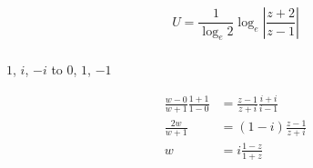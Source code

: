 \documentclass{article}
\begin{document}
\setcounter{subsubsection}{16}
\subsubsection{}

\[U = \frac{1}{\log_e 2} \log_e \left| \frac{z + 2}{z - 1} \right|\]

\setcounter{subsubsection}{18}
\subsubsection{}

$1$, $i$, $-i$ to $0$, $1$, $-1$

\begin{align*}
  \frac{w - 0}{w + 1} \frac{1 + 1}{1 - 0} & = \frac{z - 1}{z + i} \frac{i + i}{i - 1} \\
  \frac{2 w}{w + 1}                       & = (1 - i) \frac{z - 1}{z + i}             \\
  w                                       & = i \frac{1 - z}{1 + z}
\end{align*}
\end{document}
